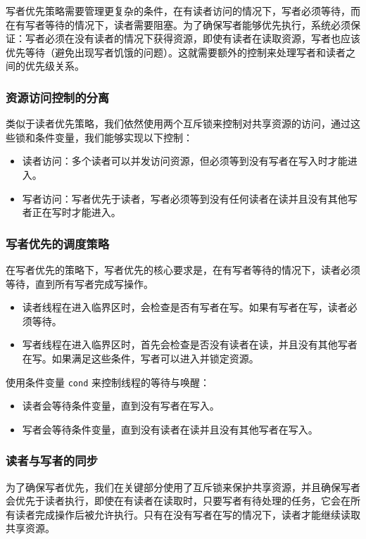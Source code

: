 写者优先策略需要管理更复杂的条件，在有读者访问的情况下，写者必须等待，而在有写者等待的情况下，读者需要阻塞。为了确保写者能够优先执行，系统必须保证：写者必须在没有读者的情况下获得资源，即使有读者在读取资源，写者也应该优先等待（避免出现写者饥饿的问题）。这就需要额外的控制来处理写者和读者之间的优先级关系。

\subsubsection{资源访问控制的分离}

类似于读者优先策略，我们依然使用两个互斥锁来控制对共享资源的访问，通过这些锁和条件变量，我们能够实现以下控制：\begin{itemize}
    \item 读者访问：多个读者可以并发访问资源，但必须等到没有写者在写入时才能进入。
    \item 写者访问：写者优先于读者，写者必须等到没有任何读者在读并且没有其他写者正在写时才能进入。
\end{itemize}

\subsubsection{写者优先的调度策略}

在写者优先的策略下，写者优先的核心要求是，在有写者等待的情况下，读者必须等待，直到所有写者完成写操作。\begin{itemize}
    \item 读者线程在进入临界区时，会检查是否有写者在写。如果有写者在写，读者必须等待。
	\item 写者线程在进入临界区时，首先会检查是否没有读者在读，并且没有其他写者在写。如果满足这些条件，写者可以进入并锁定资源。
\end{itemize}

使用条件变量 \texttt{cond} 来控制线程的等待与唤醒：\begin{itemize}
    \item 读者会等待条件变量，直到没有写者在写入。
	\item 写者会等待条件变量，直到没有读者在读并且没有其他写者在写入。
\end{itemize}

\subsubsection{读者与写者的同步}

为了确保写者优先，我们在关键部分使用了互斥锁来保护共享资源，并且确保写者会优先于读者执行，即使在有读者在读取时，只要写者有待处理的任务，它会在所有读者完成操作后被允许执行。只有在没有写者在写的情况下，读者才能继续读取共享资源。


